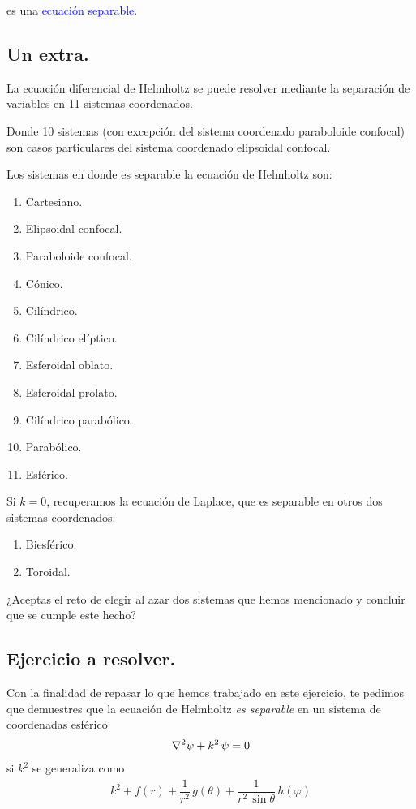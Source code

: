 es una \textcolor{blue}{ecuación separable}.

\subsection{Un extra.}

La ecuación diferencial de Helmholtz se puede resolver mediante la separación de variables en 11 sistemas coordenados.
\par
Donde 10 sistemas (con excepción del sistema coordenado paraboloide confocal) son casos particulares del sistema coordenado elipsoidal confocal.

Los sistemas en donde es separable la ecuación de Helmholtz son:
\begin{enumerate}
\item Cartesiano.
\item Elipsoidal confocal.
\item Paraboloide confocal.
\item Cónico.
\item Cilíndrico.
\item Cilíndrico elíptico.
\item Esferoidal oblato.
\item Esferoidal prolato.
\item Cilíndrico parabólico.
\item Parabólico.
\item Esférico.
\end{enumerate}


Si $k = 0$, recuperamos la ecuación de Laplace, que es separable en otros dos sistemas coordenados:
\begin{enumerate}
\item Biesférico.
\item Toroidal.
\end{enumerate}

¿Aceptas el reto de elegir al azar dos sistemas que hemos mencionado y concluir que se cumple este hecho?

\subsection{Ejercicio a resolver.}

Con la finalidad de repasar lo que hemos trabajado en este ejercicio, te pedimos que demuestres que la ecuación de Helmholtz \emph{es separable} en un sistema de coordenadas esférico
\begin{align*}
\laplacian{\psi} + k^{2} \, \psi = 0
\end{align*}
si $k^{2}$ se generaliza como
\begin{align*}
k^{2} + f(r) + \dfrac{1}{r^{2}} \, g(\theta) + \dfrac{1}{r^{2} \, \sin \theta} \, h(\varphi)
\end{align*}

